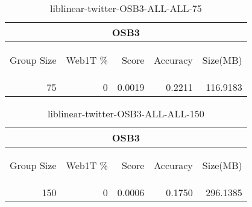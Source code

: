 \begin{center}
\begin{table}[htbp] 
 \begin{center}
\begin{tabular}{ | r | r | r | r | r |}
\hline
\multicolumn{5}{|c|}{OSB3}\\
\hline
\begin{sideways}Group Size\end{sideways} & \begin{sideways}Web1T \%\end{sideways} & \begin{sideways}Score\end{sideways} & \begin{sideways}Accuracy\end{sideways} & \begin{sideways}Size(MB)\end{sideways}\\
\hline
\multirow{0}{*}{75}
 & 0 & 0.0019 & 0.2211 & 116.9183\\ \cline{2-5}
\hline
\end{tabular}
\caption{liblinear-twitter-OSB3-ALL-ALL-75}
\label{table:liblinear-twitter-OSB3-ALL-ALL-75}
\end{center}
 \end{table}
\end{center}

\begin{center}
\begin{table}[htbp] 
 \begin{center}
\begin{tabular}{ | r | r | r | r | r |}
\hline
\multicolumn{5}{|c|}{OSB3}\\
\hline
\begin{sideways}Group Size\end{sideways} & \begin{sideways}Web1T \%\end{sideways} & \begin{sideways}Score\end{sideways} & \begin{sideways}Accuracy\end{sideways} & \begin{sideways}Size(MB)\end{sideways}\\
\hline
\multirow{0}{*}{150}
 & 0 & 0.0006 & 0.1750 & 296.1385\\ \cline{2-5}
\hline
\end{tabular}
\caption{liblinear-twitter-OSB3-ALL-ALL-150}
\label{table:liblinear-twitter-OSB3-ALL-ALL-150}
\end{center}
 \end{table}
\end{center}

